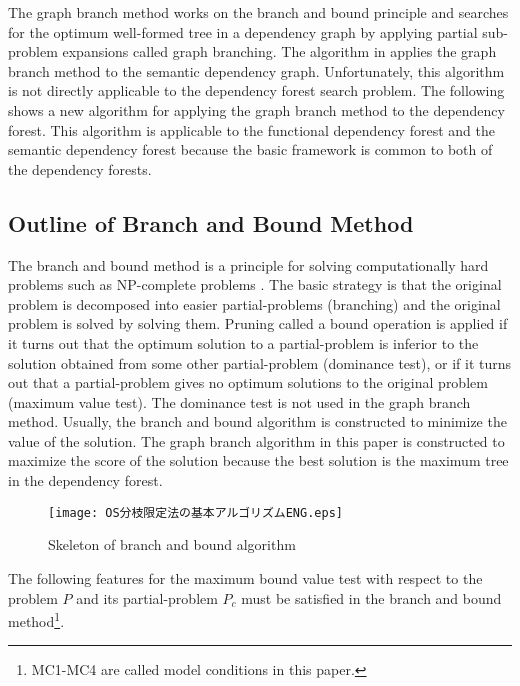 The graph branch method works on the branch and bound principle and
searches for the optimum well-formed tree in a dependency graph by
applying partial sub-problem expansions called graph branching. The
algorithm in \cite{Hirakawa01} applies the graph branch method to the
semantic dependency graph. Unfortunately, this algorithm is not
directly applicable to the dependency forest search problem. The
following shows a new algorithm for applying the graph branch method
to the dependency forest. This algorithm is applicable to the
functional dependency forest and the semantic dependency forest
because the basic framework is common to both of the dependency
forests.


\subsection{Outline of Branch and Bound Method}

The branch and bound method is a principle for solving computationally
hard problems such as NP-complete problems \cite{Ibaraki78}. The basic
strategy is that the original problem is decomposed into easier
partial-problems (branching) and the original problem is solved by
solving them. Pruning called a bound operation is applied if it turns
out that the optimum solution to a partial-problem is inferior to the
solution obtained from some other partial-problem (dominance test), or
if it turns out that a partial-problem gives no optimum solutions to
the original problem (maximum value test). The dominance test is not
used in the graph branch method. Usually, the branch and bound
algorithm is constructed to minimize the value of the solution. The
graph branch algorithm in this paper is constructed to maximize the
score of the solution because the best solution is the maximum tree in
the dependency forest.

\begin{figure}[b]
\begin{center}
     \texttt{[image: OS分枝限定法の基本アルゴリズムENG.eps]}
\end{center}
\myfiglabelskippre
\caption{Skeleton of branch and bound algorithm}
\label{fig:BBAlgorithm}
\end{figure}

The following features for the maximum bound value test with respect
to the problem $P$ and its partial-problem $P_c$ must be satisfied in
the branch and bound method\footnote{MC1-MC4 are called model conditions in this paper.}.


